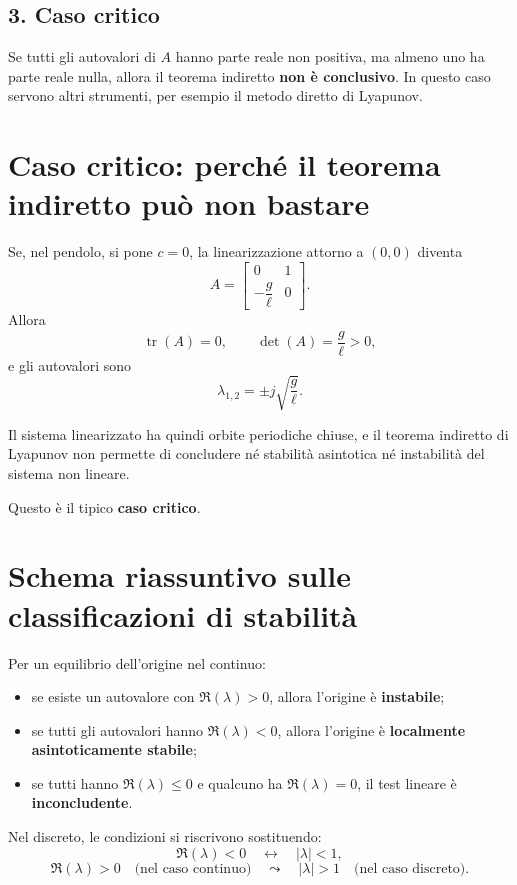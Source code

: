 \subsection*{3. Caso critico}
Se tutti gli autovalori di \(A\) hanno parte reale non positiva, ma almeno uno ha parte reale nulla, allora il teorema indiretto \textbf{non è conclusivo}. In questo caso servono altri strumenti, per esempio il metodo diretto di Lyapunov.

\bigskip

\section{Caso critico: perché il teorema indiretto può non bastare}

Se, nel pendolo, si pone \(c=0\), la linearizzazione attorno a \((0,0)\) diventa
\[
A=
\begin{bmatrix}
0 & 1\\
-\dfrac{g}{\ell} & 0
\end{bmatrix}.
\]
Allora
\[
\operatorname{tr}(A)=0,
\qquad
\det(A)=\frac{g}{\ell}>0,
\]
e gli autovalori sono
\[
\lambda_{1,2}=\pm j\sqrt{\frac{g}{\ell}}.
\]

Il sistema linearizzato ha quindi orbite periodiche chiuse, e il teorema indiretto di Lyapunov non permette di concludere né stabilità asintotica né instabilità del sistema non lineare.

Questo è il tipico \textbf{caso critico}.

\bigskip

\section{Schema riassuntivo sulle classificazioni di stabilità}

Per un equilibrio dell'origine nel continuo:
\begin{itemize}
    \item se esiste un autovalore con \(\Re(\lambda)>0\), allora l'origine è \textbf{instabile};
    \item se tutti gli autovalori hanno \(\Re(\lambda)<0\), allora l'origine è \textbf{localmente asintoticamente stabile};
    \item se tutti hanno \(\Re(\lambda)\le 0\) e qualcuno ha \(\Re(\lambda)=0\), il test lineare è \textbf{inconcludente}.
\end{itemize}

Nel discreto, le condizioni si riscrivono sostituendo:
\[
\Re(\lambda)<0
\quad \longleftrightarrow \quad
|\lambda|<1,
\]
\[
\Re(\lambda)>0
\quad \text{(nel caso continuo)}
\quad \leadsto \quad
|\lambda|>1
\quad \text{(nel caso discreto)}.
\]

